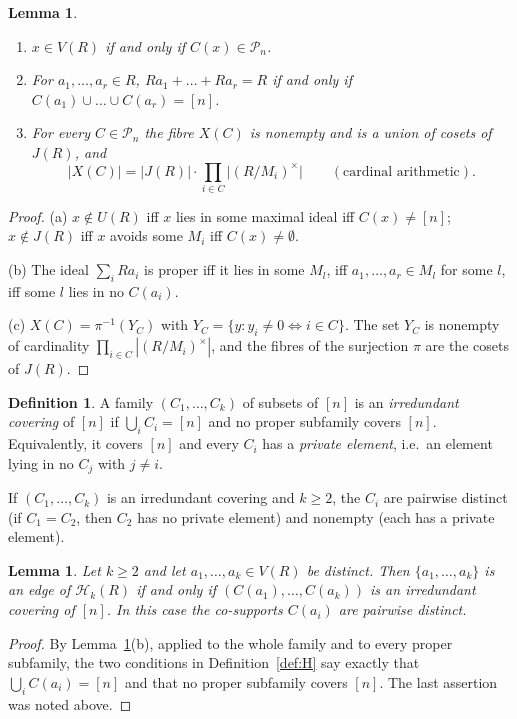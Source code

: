 \documentclass{amsart}
\newtheorem{lemma}[theorem]{Lemma}
\theoremstyle{definition}
\newtheorem{definition}[theorem]{Definition}
\theoremstyle{remark}
\newcommand{\cP}{\mathcal{P}}
\newcommand{\cH}{\mathcal{H}}
\newcommand{\nn}{[n]}
\begin{document}
\begin{lemma}\label{lem:basic}
\begin{enumerate}
\item[(a)] $x\in V(R)$ if and only if $C(x)\in\cP_n$.
\item[(b)] For $a_1,\dots,a_r\in R$, $Ra_1+\dots+Ra_r=R$ if and only if $C(a_1)\cup\dots\cup C(a_r)=\nn$.
\item[(c)] For every $C\in\cP_n$ the fibre $X(C)$ is nonempty and is a union of cosets of $J(R)$, and
\[
|X(C)|=|J(R)|\cdot\prod_{i\in C}\bigl|(R/M_i)^{\times}\bigr| \qquad(\text{cardinal arithmetic}).
\]
\end{enumerate}
\end{lemma}

\begin{proof}
(a) $x\notin U(R)$ iff $x$ lies in some maximal ideal iff $C(x)\ne\nn$; $x\notin J(R)$ iff $x$ avoids some $M_i$ iff $C(x)\ne\emptyset$.

(b) The ideal $\sum_i Ra_i$ is proper iff it lies in some $M_l$, iff $a_1,\dots,a_r\in M_l$ for some $l$, iff some $l$ lies in no $C(a_i)$.

(c) $X(C)=\pi^{-1}(Y_C)$ with $Y_C=\{y: y_i\ne 0\iff i\in C\}$. The set $Y_C$ is nonempty of cardinality $\prod_{i\in C}|(R/M_i)^\times|$, and the fibres of the surjection $\pi$ are the cosets of $J(R)$.
\end{proof}

\begin{definition}
A family $(C_1,\dots,C_k)$ of subsets of $\nn$ is an \emph{irredundant covering} of $\nn$ if $\bigcup_i C_i=\nn$ and no proper subfamily covers $\nn$. Equivalently, it covers $\nn$ and every $C_i$ has a \emph{private element}, i.e.\ an element lying in no $C_j$ with $j\ne i$.
\end{definition}

If $(C_1,\dots,C_k)$ is an irredundant covering and $k\ge 2$, the $C_i$ are pairwise distinct (if $C_1=C_2$, then $C_2$ has no private element) and nonempty (each has a private element).

\begin{lemma}\label{lem:edge}
Let $k\ge 2$ and let $a_1,\dots,a_k\in V(R)$ be distinct. Then $\{a_1,\dots,a_k\}$ is an edge of $\cH_k(R)$ if and only if $(C(a_1),\dots,C(a_k))$ is an irredundant covering of $\nn$. In this case the co-supports $C(a_i)$ are pairwise distinct.
\end{lemma}

\begin{proof}
By Lemma~\ref{lem:basic}(b), applied to the whole family and to every proper subfamily, the two conditions in Definition~\ref{def:H} say exactly that $\bigcup_i C(a_i)=\nn$ and that no proper subfamily covers $\nn$. The last assertion was noted above.
\end{proof}
\end{document}
